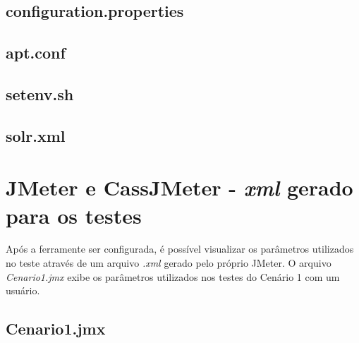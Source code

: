 \begin{apendicesenv}
\section*{configuration.properties}


\section*{apt.conf}


\section*{setenv.sh}


\section*{solr.xml}



\chapter{JMeter e CassJMeter - \textit{xml} gerado para os testes}

Após a ferramente ser configurada, é possível visualizar os parâmetros utilizados no teste através de um arquivo \textit{.xml} gerado pelo próprio JMeter. O arquivo \textit{Cenario1.jmx} exibe os parâmetros utilizados nos testes do Cenário 1 com um usuário. 

\section*{Cenario1.jmx}


\end{apendicesenv}
